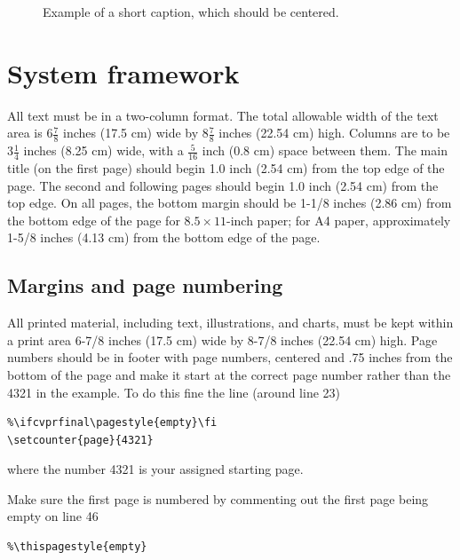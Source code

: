 \documentclass[10pt,twocolumn,letterpaper]{article}
\begin{document}
\begin{CJK}{UTF8}{bkai}
\begin{figure}
\begin{center}
      \end{center}
      \caption{Example of a short caption, which should be centered.}
      \label{fig:short}
   \end{figure}

   \section{System framework}

   All text must be in a two-column format. The total allowable width of the
   text area is $6\frac78$ inches (17.5 cm) wide by $8\frac78$ inches (22.54
   cm) high. Columns are to be $3\frac14$ inches (8.25 cm) wide, with a
   $\frac{5}{16}$ inch (0.8 cm) space between them. The main title (on the
   first page) should begin 1.0 inch (2.54 cm) from the top edge of the
   page. The second and following pages should begin 1.0 inch (2.54 cm) from
   the top edge. On all pages, the bottom margin should be 1-1/8 inches (2.86
   cm) from the bottom edge of the page for $8.5 \times 11$-inch paper; for A4
   paper, approximately 1-5/8 inches (4.13 cm) from the bottom edge of the
   page.

   \subsection{Margins and page numbering}

   All printed material, including text, illustrations, and charts, must be kept
   within a print area 6-7/8 inches (17.5 cm) wide by 8-7/8 inches (22.54 cm)
   high.
   Page numbers should be in footer with page numbers, centered and .75
   inches from the bottom of the page and make it start at the correct page
   number rather than the 4321 in the example.  To do this fine the line (around
   line 23)
   \begin{verbatim}
%\ifcvprfinal\pagestyle{empty}\fi
\setcounter{page}{4321}
\end{verbatim}
   where the number 4321 is your assigned starting page.

   Make sure the first page is numbered by commenting out the first page being
   empty on line 46
   \begin{verbatim}
%\thispagestyle{empty}
\end{verbatim}



\end{CJK}
\end{document}
